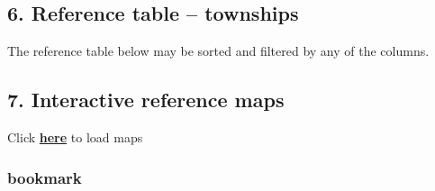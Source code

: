 \documentclass[
]{article}
\begin{document}
\hypertarget{reference-table-townships}{%
\subsection{6. Reference table --
townships}\label{reference-table-townships}}

The reference table below may be sorted and filtered by any of the
columns.

\hypertarget{interactive-reference-maps}{%
\subsection{7. Interactive reference
maps}\label{interactive-reference-maps}}

Click
\textbf{\href{https://food-security-cluster-myanmar.github.io/mmr_5w_initial_observations_maps/}{here}}
to load maps

\hypertarget{bookmark}{%
\subsubsection{bookmark}\label{bookmark}}
\end{document}
